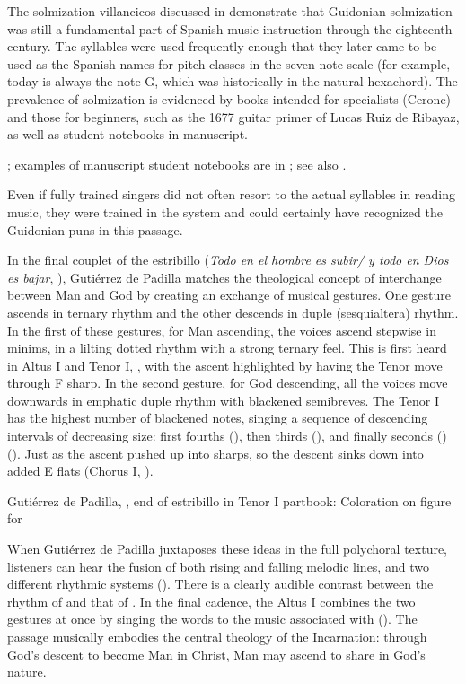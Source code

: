 The solmization villancicos discussed in  demonstrate that
Guidonian solmization was still a fundamental part of Spanish music instruction
through the eighteenth century. 
The syllables were used frequently enough that they later came to be used as
the Spanish names for pitch-classes in the seven-note scale (for example,
 today is always the note G, which was historically  in the
natural hexachord).
The prevalence of solmization is evidenced by books intended for specialists
(Cerone) and those for beginners, such as the 1677 guitar primer of
Lucas Ruiz de Ribayaz, as well as student notebooks in manuscript.%
\begin{Footnote}
    \Autocite{Ruiz:Luz}; examples of manuscript student notebooks are in
    ; see also \autocite{Cohen:NotesMiddleAges}.
\end{Footnote}
Even if fully trained singers did not often resort to the actual syllables in
reading music, they were trained in the system and could certainly have
recognized the Guidonian puns in this passage.

In the final couplet of the estribillo (\emph{Todo en el hombre es subir/ y todo
en Dios es bajar}, ), Gutiérrez de Padilla matches the
theological concept of interchange between Man and God by creating an exchange
of musical gestures.
One gesture ascends in ternary rhythm and the other descends in duple
(sesquialtera) rhythm.
In the first of these gestures, for Man ascending, the voices ascend stepwise in
minims, in a lilting dotted rhythm with a strong ternary feel.
This is first heard in Altus I and Tenor I, , with the ascent
highlighted by having the Tenor move through F sharp.
In the second gesture, for God descending, all the voices move downwards in
emphatic duple rhythm with blackened semibreves.
The Tenor I has the highest number of blackened notes, singing a sequence of
descending intervals of decreasing size: first fourths (),
then thirds (), and finally seconds ()
().
Just as the ascent pushed up into sharps, so the descent sinks down into added E
flats (Chorus I, ).

{Gutiérrez de Padilla, , end of estribillo in
Tenor I partbook: Coloration on figure for }

When Gutiérrez de Padilla juxtaposes these ideas in the full polychoral texture,
listeners can hear the fusion of both rising and falling melodic lines, and two
different rhythmic systems ().
There is a clearly audible contrast between the rhythm of  and that of .
In the final cadence, the Altus I combines the two gestures at once by singing
the words  to the music associated with
 ().
The passage musically embodies the central theology of the Incarnation: through
God's descent to become Man in Christ, Man may ascend to share in God's nature.

